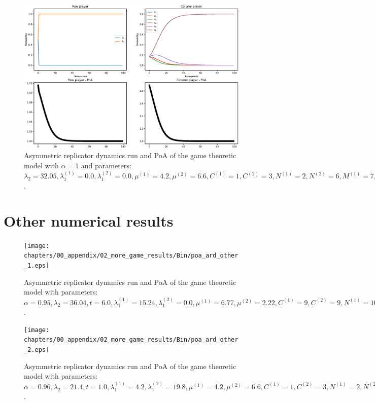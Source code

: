 \begin{figure}[H]
    \includegraphics[width=\textwidth, trim = 0 60 0 60, clip]{chapters/00_appendix/02_more_game_results/Bin/poa_ard_alpha_1.eps}
    \caption{Asymmetric replicator dynamics run and PoA of the game theoretic
    model with \(\alpha = 1\) and parameters: \(\lambda_2 = 32.05,
    \lambda_1^{(1)} = 0.0, \lambda_1^{(2)} = 0.0, \mu^{(1)} = 4.2,
    \mu^{(2)} = 6.6, C^{(1)} = 1, C^{(2)} = 3, N^{(1)} = 2, N^{(2)} = 6,
    M^{(1)} = 7, M^{(2)} = 4, t = 2.0\).}
    \label{fig:poa_ard_alpha_1}
\end{figure}


\section{Other numerical results}


\begin{figure}[H]
    \texttt{[image: chapters/00\_appendix/02\_more\_game\_results/Bin/poa\_ard\_other\_1.eps]}
    \caption{Asymmetric replicator dynamics run and PoA of the game theoretic
    model with parameters: \(\alpha = 0.95, \lambda_2 = 36.04, t = 6.0,
    \lambda_1^{(1)} = 15.24, \lambda_1^{(2)} = 0.0, \mu^{(1)} = 6.77,
    \mu^{(2)} = 2.22, C^{(1)} = 9, C^{(2)} = 9, N^{(1)} = 10, N^{(2)} = 9,
    M^{(1)} = 4, M^{(2)} = 3\).}
    \label{fig:poa_ard_other_1}
\end{figure}


\begin{figure}[H]
    \texttt{[image: chapters/00\_appendix/02\_more\_game\_results/Bin/poa\_ard\_other\_2.eps]}
    \caption{Asymmetric replicator dynamics run and PoA of the game theoretic
    model with parameters: \(\alpha = 0.96, \lambda_2 = 21.4, t = 1.0,
    \lambda_1^{(1)} = 4.2, \lambda_1^{(2)} = 19.8, \mu^{(1)} = 4.2,
    \mu^{(2)} = 6.6, C^{(1)} = 1, C^{(2)} = 3, N^{(1)} = 2, N^{(2)} = 6,
    M^{(1)} = 7, M^{(2)} = 4\).}
    \label{fig:poa_ard_other_2}
\end{figure}


